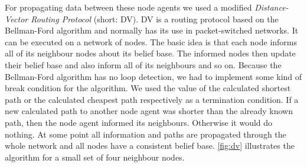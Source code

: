For propagating data between these node agents we used a modified \emph{Distance-Vector Routing Protocol} (short: DV).
DV is a routing protocol based on the Bellman-Ford algorithm and normally has its use in packet-switched networks.
It can be executed on a network of nodes.
The basic idea is that each node informs all of its neighbour nodes about its belief base.
The informed nodes then update their belief base and also inform all of its neighbours and so on.
Because the Bellman-Ford algorithm has no loop detection, we had to implement some kind of break condition for the algorithm.
We used the value of the calculated shortest path or the calculated cheapest path respectively as a termination condition.
If a new calculated path to another node agent was shorter than the already known path, then the node agent informed its neighbours.
Otherwise it would do nothing.
At some point all information and paths are propagated through the whole network and all nodes have a consistent belief base.
\autoref{fig:dv} illustrates the algorithm for a small set of four neighbour nodes.

